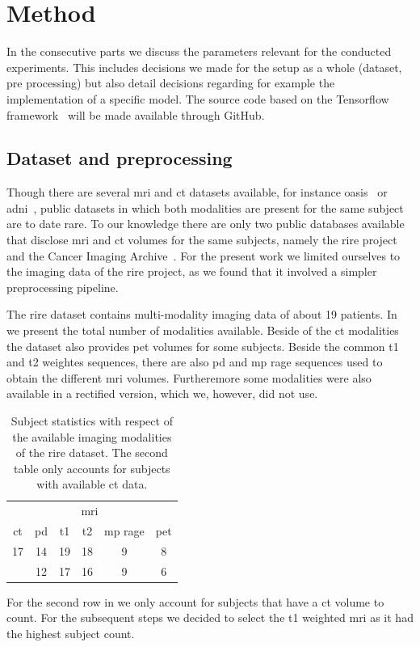 \section{Method}

In the consecutive parts we discuss the parameters relevant for the conducted
experiments. This includes decisions we made for the setup as a whole
(dataset, pre processing) but also detail decisions regarding for example
the implementation of a specific model. The source code based on the
Tensorflow framework~\cite{tensorflow15} will be made available through
GitHub.

\subsection{Dataset and preprocessing}

Though there are several \gls{mri} and \gls{ct} datasets available, for
instance \gls{oasis}~\cite{OASIS} or \gls{adni}~\cite{ADNI}, public datasets
in which both modalities are present for the same subject are to date rare. To
our knowledge there are only two public databases available that disclose
\gls{mri} and \gls{ct} volumes for the same subjects, namely the \gls{rire}
project~\cite{RIRE} and the Cancer Imaging Archive~\cite{CIA}. For the present
work we limited ourselves to the imaging data of the \gls{rire} project, as we
found that it involved a simpler preprocessing pipeline.

The \gls{rire} dataset contains multi-modality imaging data of about \num{19}
patients. In  we present the total number of modalities
available. Beside of the \gls{ct} modalities the dataset also provides
\gls{pet} volumes for some subjects. Beside the common \gls{t1} and \gls{t2}
weightes sequences, there are also \gls{pd} and \gls{mp} \gls{rage} sequences
used to obtain the different \gls{mri} volumes. Furtheremore some modalities
were also available in a rectified version, which we, however, did not use.
\begin{table}[h]
  \centering
  \begin{tabular}{*{6}{c}}
    \toprule
             & \multicolumn{4}{c}{\gls{mri}} & \\
    \cmidrule{2-5}
    \gls{ct} & \gls{pd} & \gls{t1} & \gls{t2} & \gls{mp} \gls{rage} & \gls{pet} \\
    \midrule
    \num{17} & \num{14} & \num{19} & \num{18} & \num{9} & \num{8} \\
             & \num{12} & \num{17} & \num{16} & \num{9} & \num{6} \\
    \bottomrule
  \end{tabular}
  \caption{Subject statistics with respect of the available imaging
    modalities of the \gls{rire} dataset. The second table only accounts for
    subjects with available \gls{ct} data.
  }\label{tab:rire}
\end{table}
For the second row in  we only account for subjects that have
a \gls{ct} volume to count. For the subsequent steps we decided to select the
\gls{t1} weighted \gls{mri} as it had the highest subject count.

